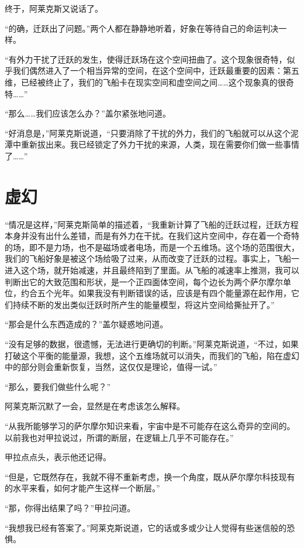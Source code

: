 终于，阿莱克斯又说话了。 

“的确，迁跃出了问题。”两个人都在静静地听着，好象在等待自己的命运判决一样。 

“有外力干扰了迁跃的发生，使得迁跃场在这个空间扭曲了。这个现象很奇特，似乎我们偶然进入了一个相当异常的空间，在这个空间中，迁跃最重要的因素：第五维，已经被终止了，我们的飞船卡在现实空间和虚空间之间……这个现象真的很奇特……” 

“那么……我们应该怎么办？”盖尔紧张地问道。 

“好消息是，”阿莱克斯说道，“只要消除了干扰的外力，我们的飞船就可以从这个泥潭中重新拔出来。我已经锁定了外力干扰的来源，人类，现在需要你们做一些事情了……” 

\chapter{虚幻}

“情况是这样，”阿莱克斯简单的描述着，“我重新计算了飞船的迁跃过程，迁跃方程本身并没有出什么差错，而是有外力在干扰。在我们这片空间中，存在着一个奇特的场，即不是力场，也不是磁场或者电场，而是一个五维场。这个场的范围很大，我们的飞船好象是被这个场给吸了过来，从而改变了迁跃的过程。事实上，飞船一进入这个场，就开始减速，并且最终陷到了里面。从飞船的减速率上推测，我可以判断出它的大致范围和形状，是一个正四面体空间，每个边长为两个萨尔摩尔单位，约合五个光年。如果我没有判断错误的话，应该是有四个能量源在起作用，它们持续不断的发出类似迁跃时所产生的能量模型，将这片空间给撕扯开了。” 

“那会是什么东西造成的？”盖尔疑惑地问道。 

“没有足够的数据，很遗憾，无法进行更确切的判断。”阿莱克斯说道，“不过，如果打破这个平衡的能量源，我想，这个五维场就可以消失，而我们的飞船，陷在虚幻中的部分则会重新恢复，当然，这仅仅是理论，值得一试。” 

“那么，要我们做些什么呢？” 

阿莱克斯沉默了一会，显然是在考虑该怎么解释。 

“从我所能够学习的萨尔摩尔知识来看，宇宙中是不可能存在这么奇异的空间的。以前我也对甲拉说过，所谓的断层，在逻辑上几乎不可能存在。” 

甲拉点点头，表示他还记得。 

“但是，它既然存在，我就不得不重新考虑，换一个角度，既从萨尔摩尔科技现有的水平来看，如何才能产生这样一个断层。” 

“那，你得出结果了吗？”甲拉问道。 

“我想我已经有答案了。”阿莱克斯说道，它的话或多或少让人觉得有些迷信般的恐惧。 

